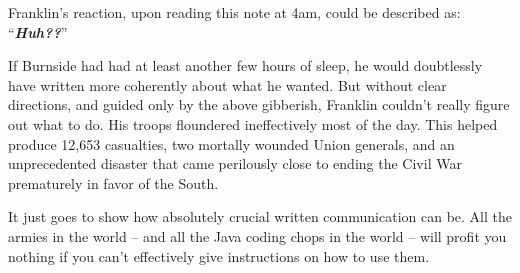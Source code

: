 \normalsize

Franklin's reaction, upon reading this note at 4am, could be described as:
``\textit{\textbf{Huh??}}''

If Burnside had had at least another few hours of sleep, he would doubtlessly
have written more coherently about what he wanted. But without clear
directions, and guided only by the above gibberish, Franklin couldn't really
figure out what to do. His troops floundered ineffectively most of the day.
This helped produce 12,653 casualties, two mortally wounded Union generals,
and an unprecedented disaster that came perilously close to ending the Civil
War prematurely in favor of the South.

It just goes to show how absolutely crucial written communication can be. All
the armies in the world -- and all the Java coding chops in the world -- will
profit you nothing if you can't effectively give instructions on how to use
them.
